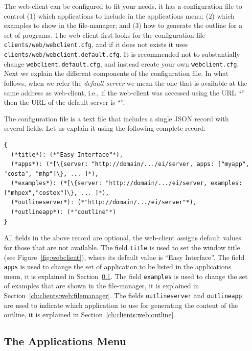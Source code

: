 The web-client can be configured to fit your needs, it has a
configuration file to control (1) which applications to include in the
applications menu; (2) which examples to show in the file-manager; and
(3) how to generate the outline for a set of programs.
%
The web-client first looks for the configuration file
\texttt{clients/web/webclient.cfg}, and if it does not exists it uses
\texttt{clients/web/webclient.default.cfg}.
%
It is recommended not to substantially change
\texttt{webclient.default.cfg}, and instead create your own
\texttt{webclient.cfg}.
%
Next we explain the different components of the configuration file. In
what follows, when we refer the \emph{default server} we mean the one
that is available at the same address as web-client, i.e., if the
web-client was accessed using the URL
``'' then the URL of the
default server is ``''.

The configuration file is a text file that includes a single JSON
record with several fields. Let us explain it using the following
complete record:

\bigskip
\begin{lstlisting}
{
  (*title*): (*"Easy Interface"*),
  (*apps*): (*[\{server: "http://domain/.../ei/server, apps: ["myapp", "costa", "mhp"]\}, ... ]*),
  (*examples*): (*[\{server: "http://domain/.../ei/server, examples: ["mhpex","costex"]\}, ... ]*),
  (*outlineserver*): (*"http://domain/.../ei/server"*),
  (*outlineapp*): (*"coutline"*)
}
\end{lstlisting}

\bigskip
\noindent
All fields in the above record are optional, the web-client assigns
default values for those that are not available. 
%
The field \texttt{title} is used to set the window title (see
Figure~\ref{fig:webclient}), where its default value is ``Easy
Interface''. The field \texttt{apps} is used to change the set of
application to be listed in the applications menu, it is explained in
Section~\ref{ch:clients:web:appsmenu}. The field \texttt{examples} is
used to change the set of examples that are shown in the file-manager,
it is explained in Section~\ref{ch:clients:web:filemanager}. The
fields \texttt{outlineserver} and \texttt{outlineapp} are used to
indicate which application to use for generating the content of the
outline, it is explained in Section~\ref{ch:clients:web:outline}.

\subsection{The Applications Menu}
\label{ch:clients:web:appsmenu}

